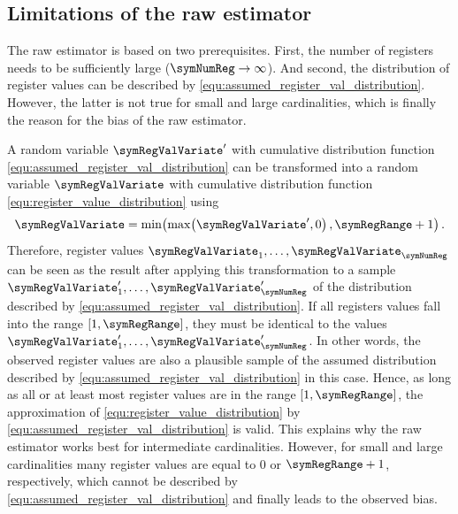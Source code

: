 \documentclass[a4paper]{scrartcl}
\begin{document}
\subsection{Limitations of the raw estimator}
The raw estimator is based on two prerequisites. First, the number of registers needs to be sufficiently large ($\symNumReg\rightarrow\infty$). And second, the distribution of register values can be described by \eqref{equ:assumed_register_val_distribution}. However, the latter is not true for small and large cardinalities, which is finally the reason for the bias of the raw estimator.

A random variable $\symRegValVariate'$ with cumulative distribution function \eqref{equ:assumed_register_val_distribution} can be transformed into a random variable $\symRegValVariate$ with cumulative distribution function \eqref{equ:register_value_distribution} using
\begin{equation}
\label{equ:dist_transformation}
\symRegValVariate = \min\!\left(\max\!\left(\symRegValVariate',0\right), \symRegRange+1\right).
\end{equation}
Therefore, register values $\symRegValVariate_1,\ldots,\symRegValVariate_\symNumReg$ can be seen as the result after applying this transformation to a sample $\symRegValVariate'_1,\ldots,\symRegValVariate'_\symNumReg$ of the distribution described by \eqref{equ:assumed_register_val_distribution}. If all registers values fall into the range $[1,\symRegRange]$, they must  be identical to the values $\symRegValVariate'_1,\ldots,\symRegValVariate'_\symNumReg$. In other words, the observed register values are also a plausible sample of the assumed distribution described by \eqref{equ:assumed_register_val_distribution} in this case. Hence, as long as all or at least most register values are in the range $[1,\symRegRange]$, the approximation of \eqref{equ:register_value_distribution} by \eqref{equ:assumed_register_val_distribution} is valid. This explains why the raw estimator works best for intermediate cardinalities. However, for small and large cardinalities many register values are equal to 0 or $\symRegRange+1$, respectively, which cannot be described by \eqref{equ:assumed_register_val_distribution} and finally leads to the observed bias.
\end{document}
